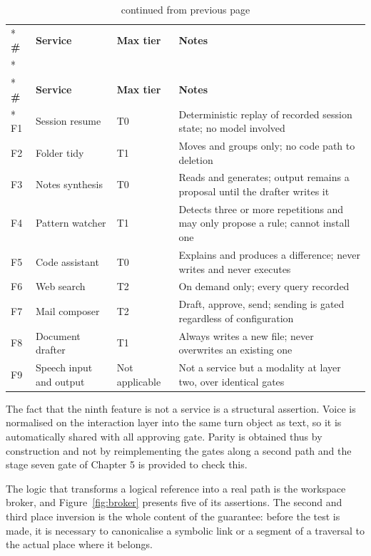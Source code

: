 \documentclass{FastFyp}
\begin{document}
{
\begin{longtable}{|p{0.9cm}|p{3.4cm}|p{1.6cm}|p{6.4cm}|}
\caption{Capability services and risk tiers.}\label{tab:services}\\*
\hline
\textbf{\#} & \textbf{Service} & \textbf{Max tier} & \textbf{Notes} \\*
\hline
\endfirsthead
\caption[]{continued from previous page}\\*
\hline
\textbf{\#} & \textbf{Service} & \textbf{Max tier} & \textbf{Notes} \\*
\hline
\endhead
\hline
F1 & Session resume & T0 & Deterministic replay of recorded session state; no model involved \\
\hline
F2 & Folder tidy & T1 & Moves and groups only; no code path to deletion \\
\hline
F3 & Notes synthesis & T0 & Reads and generates; output remains a proposal until the drafter writes it \\
\hline
F4 & Pattern watcher & T1 & Detects three or more repetitions and may only propose a rule; cannot install one \\
\hline
F5 & Code assistant & T0 & Explains and produces a difference; never writes and never executes \\
\hline
F6 & Web search & T2 & On demand only; every query recorded \\
\hline
F7 & Mail composer & T2 & Draft, approve, send; sending is gated regardless of configuration \\
\hline
F8 & Document drafter & T1 & Always writes a new file; never overwrites an existing one \\
\hline
F9 & Speech input and output & Not applicable & Not a service but a modality at layer two, over identical gates \\
\hline
\end{longtable}
}

The fact that the ninth feature is not a service is a structural assertion. Voice is normalised on the interaction layer into the same turn object as text, so it is automatically shared with all approving gate. Parity is obtained thus by construction and not by reimplementing the gates along a second path and the stage seven gate of Chapter 5 is provided to check this.

The logic that transforms a logical reference into a real path is the workspace broker, and Figure~\ref{fig:broker} presents five of its assertions. The second and third place inversion is the whole content of the guarantee: before the test is made, it is necessary to canonicalise a symbolic link or a segment of a traversal to the actual place where it belongs.
\end{document}
